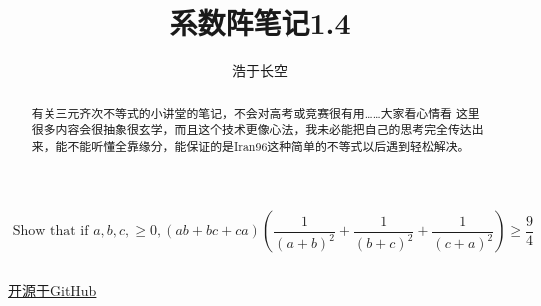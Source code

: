 \documentclass[UTF8]{ctexart}
\begin{document}
	

\title{系数阵笔记1.4}
\author{浩于长空}


\maketitle

$$\text { Show that if } a, b, c,\geq 0,(a b+b c+c a)\left(\frac{1}{(a+b)^{2}}+\frac{1}{(b+c)^{2}}+\frac{1}{(c+a)^{2}}\right) \geq \frac{9}{4}
$$
\begin{flushright}
\end{flushright}
\begin{displaymath}
\end{displaymath}

\begin{center}
	\href{https://github.com/Raymond0Hui/LaTeXwork-open}{开源于GitHub}
\end{center}

\begin{abstract}
	有关三元齐次不等式的小讲堂的笔记，不会对高考或竞赛很有用……大家看心情看
	这里很多内容会很抽象很玄学，而且这个技术更像心法，我未必能把自己的思考完全传达出来，能不能听懂全靠缘分，能保证的是Iran96这种简单的不等式以后遇到轻松解决。
\end{abstract}

\newpage
\end{document}
